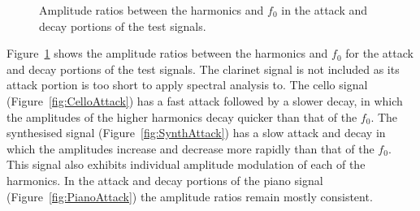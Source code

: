 \begin{figure}[h!]
			\caption{Amplitude ratios between the harmonics and $f_{0}$ in the attack and decay
				 portions of the test signals.}
			\label{fig:AttackAmplitudes}
		\end{figure}

		Figure~\ref{fig:AttackAmplitudes} shows the amplitude ratios between the harmonics and $f_{0}$ for the
		attack and decay portions of the test signals. The clarinet signal is not included as its attack portion is
		too short to apply spectral analysis to. The cello signal (Figure~\ref{fig:CelloAttack}) has a fast attack
		followed by a slower decay, in which the amplitudes of the higher harmonics decay quicker than that of the
		$f_{0}$. The synthesised signal (Figure~\ref{fig:SynthAttack}) has a slow attack and decay in which the
		amplitudes increase and decrease more rapidly than that of the $f_{0}$. This signal also exhibits
		individual amplitude modulation of each of the harmonics. In the attack and decay portions of the piano
		signal (Figure~\ref{fig:PianoAttack}) the amplitude ratios remain mostly consistent.

